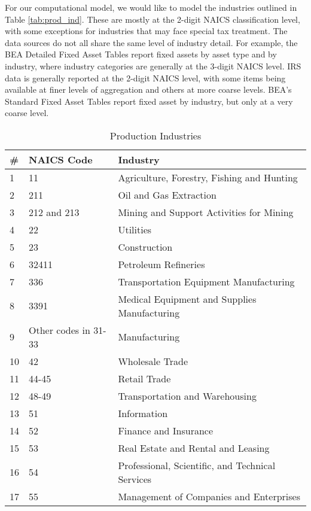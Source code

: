 \documentclass[article,11pt,letterpaper,fleqn]{article}
\theoremstyle{definition}
\numberwithin{equation}{section}
\begin{document}
For our computational model, we would like to model the industries outlined in Table \ref{tab:prod_ind}. These are mostly at the 2-digit NAICS classification level, with some exceptions for industries that may face special tax treatment.  The data sources do not all share the same level of industry detail.  For example, the BEA Detailed Fixed Asset Tables report fixed assets by asset type and by industry, where industry categories are generally at the 3-digit NAICS level.  IRS data is generally reported at the 2-digit NAICS level, with some items being available at finer levels of aggregation and others at more coarse levels.  BEA's Standard Fixed Asset Tables report fixed asset by industry, but only at a very coarse level.  

\begin{table}[htbp]
  \centering
  \caption{Production Industries}
    \begin{tabular}{lll}
    \hline
    \hline
    \# & NAICS Code & Industry \\
    \hline
    1     & 11    & Agriculture, Forestry, Fishing and Hunting \\
    2     & 211   & Oil and Gas Extraction \\
    3     & 212 and 213 & Mining and Support Activities for Mining \\
    4     & 22    & Utilities \\
    5     & 23    & Construction \\
    6     & 32411 & Petroleum Refineries \\
    7     & 336   & Transportation Equipment Manufacturing \\
    8     & 3391  & Medical Equipment and Supplies Manufacturing \\
    9     & Other codes in 31-33 & Manufacturing \\
    10    & 42    & Wholesale Trade \\
    11    & 44-45 & Retail Trade \\
    12    & 48-49 & Transportation and Warehousing \\
    13    & 51    & Information \\
    14    & 52    & Finance and Insurance \\
    15    & 53    & Real Estate and Rental and Leasing \\
    16    & 54    & Professional, Scientific, and Technical Services \\
    17    & 55    & Management of Companies and Enterprises \\

\end{tabular}
\end{table}
\end{document}
